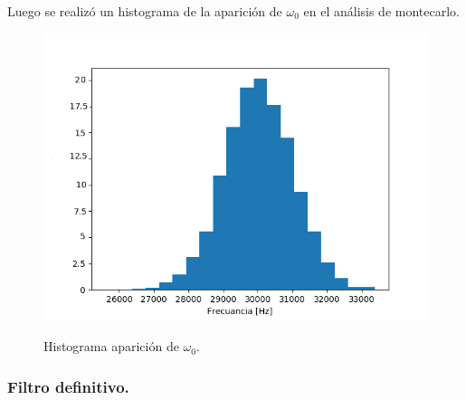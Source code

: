 Luego se realizó un histograma de la aparición de $\omega_0$ en el análisis de montecarlo.
\begin{figure}[H]
	\centering
	\includegraphics[width=\textwidth]{Imagenes-Ej2/histW0.png}
	\label{fig:graph}
	\caption{Histograma aparición de $\omega_0$.}
\end{figure}

\subsubsection{Filtro definitivo.}

